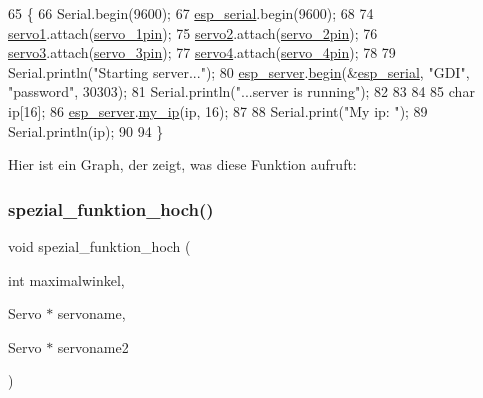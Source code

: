 \begin{DoxyCode}
65              \{
66   Serial.begin(9600);
67   \hyperlink{_arduino__kommentiert_8ino_af690b3a6882292855c4091ede8039998}{esp\_serial}.begin(9600);
68 
74   \hyperlink{_arduino__kommentiert_8ino_ac5d2bea44c6318454db0e2639a4efe95}{servo1}.attach(\hyperlink{_arduino__kommentiert_8ino_ac5b3a3df1bbdb6b2c8e8988c7373ad97}{servo\_1pin});
75   \hyperlink{_arduino__kommentiert_8ino_a6458146b8e54c3729bbee8c037921c72}{servo2}.attach(\hyperlink{_arduino__kommentiert_8ino_a0fcb42829030c7eab1ede7429256f14d}{servo\_2pin});
76   \hyperlink{_arduino__kommentiert_8ino_a7c0244e667b5f7c873df01946f0767bd}{servo3}.attach(\hyperlink{_arduino__kommentiert_8ino_a006b96047ca9585e312d88690d5a95a3}{servo\_3pin});
77   \hyperlink{_arduino__kommentiert_8ino_a207f149c99b91a8bacd26b8b70dfc71c}{servo4}.attach(\hyperlink{_arduino__kommentiert_8ino_a5c0d394c06f48072ed4a5cf3f5f3b81b}{servo\_4pin});
78 
79   Serial.println(\textcolor{stringliteral}{"Starting server..."});
80   \hyperlink{_arduino__kommentiert_8ino_a92309e3a6d185d9188757bac49168fe5}{esp\_server}.\hyperlink{class_esp_server_a1d032e732d4733905d676ef016fcd43c}{begin}(&\hyperlink{_arduino__kommentiert_8ino_af690b3a6882292855c4091ede8039998}{esp\_serial}, \textcolor{stringliteral}{"GDI"}, \textcolor{stringliteral}{"password"}, 30303);
81   Serial.println(\textcolor{stringliteral}{"...server is running"});
82 
83 
84   
85   \textcolor{keywordtype}{char} ip[16];
86   \hyperlink{_arduino__kommentiert_8ino_a92309e3a6d185d9188757bac49168fe5}{esp\_server}.\hyperlink{class_esp_server_a55995fd6398892be5768da85dde4f533}{my\_ip}(ip, 16);
87 
88   Serial.print(\textcolor{stringliteral}{"My ip: "});
89   Serial.println(ip);
90 
94 \}
\end{DoxyCode}
Hier ist ein Graph, der zeigt, was diese Funktion aufruft\+:
\mbox{\label{_arduino__kommentiert_8ino_ac03f54892f7473625ec7d6498ea5a010}} 
\subsubsection{\texorpdfstring{spezial\+\_\+funktion\+\_\+hoch()}{spezial\_funktion\_hoch()}}
{\footnotesize\ttfamily void spezial\+\_\+funktion\+\_\+hoch (\begin{DoxyParamCaption}\item[{int}]{maximalwinkel,  }\item[{Servo $\ast$}]{servoname,  }\item[{Servo $\ast$}]{servoname2 }\end{DoxyParamCaption})}



